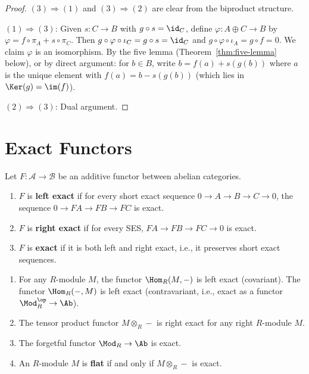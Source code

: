 \begin{proof}
$(3) \Rightarrow (1)$ and $(3) \Rightarrow (2)$ are clear from the biproduct structure.

$(1) \Rightarrow (3)$: Given $s \colon C \to B$ with $g \circ s = \id_C$, define
$\varphi \colon A \oplus C \to B$ by $\varphi = f \circ \pi_A + s \circ \pi_C$.
Then $g \circ \varphi \circ \iota_C = g \circ s = \id_C$ and
$g \circ \varphi \circ \iota_A = g \circ f = 0$. We claim $\varphi$ is an isomorphism.
By the five lemma (Theorem~\ref{thm:five-lemma} below), or by direct argument:
for $b \in B$, write $b = f(a) + s(g(b))$ where $a$ is the unique element with
$f(a) = b - s(g(b))$ (which lies in $\Ker(g) = \im(f)$).

$(2) \Rightarrow (3)$: Dual argument.
\end{proof}


\section{Exact Functors}\label{sec:exact-functors}

\begin{definition}\label{def:exact-functor}
Let $F \colon \mathcal{A} \to \mathcal{B}$ be an additive functor between abelian categories.
\begin{enumerate}
    \item $F$ is \textbf{left exact} if for every short exact sequence
    $0 \to A \to B \to C \to 0$, the sequence $0 \to FA \to FB \to FC$ is exact.
    \item $F$ is \textbf{right exact} if for every SES, $FA \to FB \to FC \to 0$ is exact.
    \item $F$ is \textbf{exact} if it is both left and right exact, i.e., it preserves
    short exact sequences.
\end{enumerate}
\end{definition}

\begin{example}\label{ex:exact-functors}
\begin{enumerate}
    \item{}
    For any $R$-module $M$, the functor $\Hom_R(M, -)$ is left exact (covariant).
    The functor $\Hom_R(-, M)$ is left exact (contravariant, i.e., exact as a functor
    $\Mod_R^{\op} \to \Ab$).
    \item{}
    The tensor product functor $M \otimes_R -$ is right exact for any right $R$-module $M$.
    \item The forgetful functor $\Mod_R \to \Ab$ is exact.
    \item{}
    An $R$-module $M$ is \textbf{flat} if and only if $M \otimes_R -$ is exact.
\end{enumerate}
\end{example}


